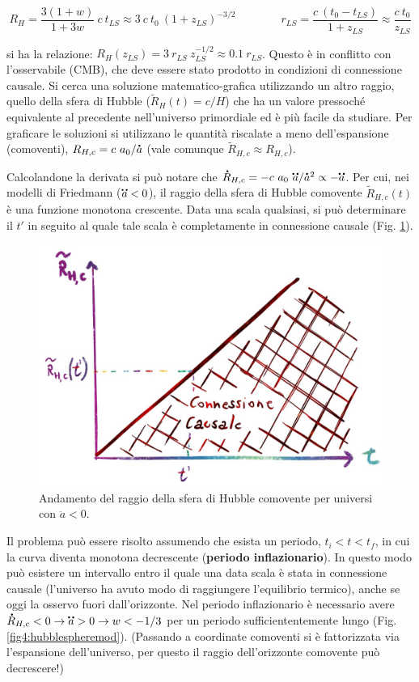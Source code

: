 \begin{equation*}
R_H = \frac{3(1+w)}{1+3w} ~c ~t_{LS} \approx  3 ~c ~t_0 ~ (1+z_{LS})^{-3/2} \qquad\qquad r_{LS} = \frac{c ~(t_0 - t_{LS})}{1+z_{LS}} \approx \frac{c ~t_0}{z_{LS}}
\end{equation*}

si ha la relazione: $R_H(z_{LS}) = 3 ~r_{LS} ~z_{LS}^{-1/2} \approx 0.1 ~r_{LS} $. Questo è in conflitto con l'osservabile (CMB), che deve essere stato prodotto in condizioni di connessione causale. Si cerca una soluzione matematico-grafica utilizzando un altro raggio, quello della sfera di Hubble ($\tilde{R}_H (t) = c/H $) che ha un valore pressoché equivalente al precedente nell'universo primordiale ed è più facile da studiare. Per graficare le soluzioni si utilizzano le quantità riscalate a meno dell'espansione (comoventi), $R_{H,c} = c ~a_0 / \accentset{\mbox{\large\bfseries .}}{a}$ (vale comunque $ \tilde{R}_{H,c} \approx R_{H,c}$). 

Calcolandone la derivata si può notare che $\accentset{\mbox{\large\bfseries .}}{R}_{H, c}=- c ~a_0 ~\accentset{\mbox{\large\bfseries ..}}{a} / \accentset{\mbox{\large\bfseries .}}{a}^2 \propto - \accentset{\mbox{\large\bfseries ..}}{a}$. Per cui, nei modelli di Friedmann ($\accentset{\mbox{\large\bfseries ..}}{a}<0$), il raggio della sfera di Hubble comovente $\tilde{R}_{H,c} (t)$ è una funzione monotona crescente. Data una scala qualsiasi, si può determinare il $t'$ in seguito al quale tale scala è completamente in connessione causale (Fig. \ref{fig4:hubblesphere}). 

\begin{figure}[ht]
    \centering
    \includegraphics[width=.8\textwidth]{Pictures/4/rsferahubble-t.jpg}
    \caption{Andamento del raggio della sfera di Hubble comovente per universi con $\ddot{a}<0$.}
    \label{fig4:hubblesphere}
\end{figure}

Il problema può essere risolto assumendo che esista un periodo, $t_i<t<t_f$, in cui la curva diventa monotona decrescente (\textbf{periodo inflazionario}). In questo modo può esistere un intervallo entro il quale una data scala è stata in connessione causale (l'universo ha avuto modo di raggiungere l'equilibrio termico), anche se oggi la osservo fuori dall'orizzonte. Nel periodo inflazionario è necessario avere $\accentset{\mbox{\large\bfseries .}}{R}_{H, c}<0 \rightarrow \accentset{\mbox{\large\bfseries ..}}{a}>0  \rightarrow w <-1/3$ per un periodo sufficiententemente lungo (Fig. \ref{fig4:hubblespheremod}). (Passando a coordinate comoventi si è fattorizzata via l'espansione dell'universo, per questo il raggio dell'orizzonte comovente può decrescere!)

